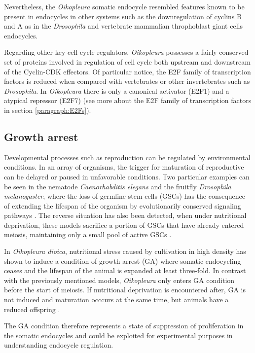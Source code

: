 \documentclass[11pt,twoside,a4paper]{report}
\begin{document}
		Nevertheless, the \textit{Oikopleura} somatic endocycle resembled features known to be present in endocycles in other systems such as the downregulation of cyclins B and A as in the \textit{Drosophila} and vertebrate mammalian throphoblast giant cells endocycles.
		
		Regarding other key cell cycle regulators, \textit{Oikopleura} possesses a fairly conserved set of proteins involved in regulation of cell cycle both upstream and downstream of the Cyclin-CDK effectors. Of particular notice, the E2F family of transcription factors is reduced when compared with vertebrates or other invertebrates such as \textit{Drosophila}. In \textit{Oikopleura} there is only a canonical activator (E2F1) and a atypical repressor (E2F7) (see more about the E2F family of transcription factors in section \ref{paragraph:E2Fs}).
		
		\subsection{Growth arrest}
		Developmental processes such as reproduction can be regulated by environmental conditions. In an array of organisms, the trigger for maturation of reproductive can be delayed or paused in unfavorable conditions. Two particular examples can be seen in the nematode \textit{Caenorhabditis elegans} and the fruitfly \textit{Drosophila melanogaster}, where the loss of germline stem cells (GSCs) has the consequence of extending the lifespan of the organism by evolutionarily conserved signaling pathways \cite{Kenyon2010}. The reverse situation has also been detected, when under nutritional deprivation, these models sacrifice a portion of GSCs that have already entered meiosis, maintaining only a small pool of active GSCs \cite{Subramaniam2014}.

		In \textit{Oikopleura dioica}, nutritional stress caused by cultivation in high density has shown to induce a condition of growth arrest (GA) where somatic endocycling ceases 	and the lifespan of the animal is expanded at least three-fold. In contrast with the previously mentioned models, \textit{Oikopleura} only enters GA condition before the start of meiosis. If nutritional deprivation is encountered after, GA is not induced and maturation occcurs at the same time, but animals have a reduced offspring \cite{Subramaniam2014}.
		
		The GA condition therefore represents a state of suppression of proliferation in the somatic endocycles and could be exploited for experimental purposes in understanding endocycle regulation.
	
\end{document}
